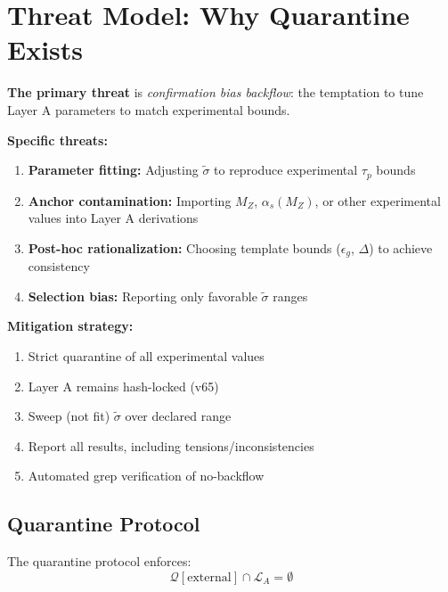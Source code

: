 \documentclass[11pt,a4paper]{article}
\theoremstyle{definition}
\begin{document}
\tableofcontents
\newpage

\section{Threat Model: Why Quarantine Exists}
\label{sec:threat}

\begin{threatbox}
\textbf{The primary threat} is \emph{confirmation bias backflow}: the temptation
to tune Layer A parameters to match experimental bounds.

\textbf{Specific threats:}
\begin{enumerate}
  \item \textbf{Parameter fitting:} Adjusting $\tilde{\sigma}$ to reproduce
        experimental $\tau_p$ bounds
  \item \textbf{Anchor contamination:} Importing $M_Z$, $\alpha_s(M_Z)$, or
        other experimental values into Layer A derivations
  \item \textbf{Post-hoc rationalization:} Choosing template bounds ($\epsilon_g$,
        $\Delta$) to achieve consistency
  \item \textbf{Selection bias:} Reporting only favorable $\tilde{\sigma}$ ranges
\end{enumerate}

\textbf{Mitigation strategy:}
\begin{enumerate}
  \item Strict quarantine of all experimental values
  \item Layer A remains hash-locked (v65)
  \item Sweep (not fit) $\tilde{\sigma}$ over declared range
  \item Report all results, including tensions/inconsistencies
  \item Automated grep verification of no-backflow
\end{enumerate}
\end{threatbox}

\subsection{Quarantine Protocol}
\label{subsec:quarantine-protocol}

The quarantine protocol enforces:
\begin{equation}
\label{eq:quarantine-rule}
\mathcal{Q}[\text{external}] \cap \mathcal{L}_A = \emptyset
\end{equation}
\end{document}
